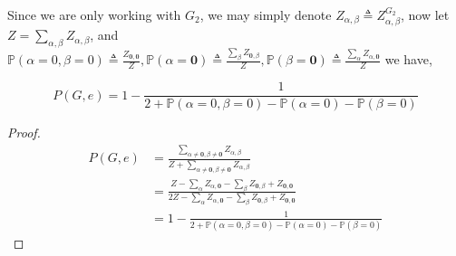 Since we are only working with $G_2$, we may simply denote $Z_{\alpha, \beta} \triangleq Z_{\alpha, \beta}^{G_2}$, now let $Z = \sum_{\alpha , \beta} Z_{\alpha, \beta}$, and $\mathbb{P} \left( \alpha = 0, \beta = 0 \right) \triangleq \frac{Z_{\mathbf{0},\mathbf{0}}}{Z}, \mathbb{P} \left( \alpha = \mathbf{0} \right) \triangleq \frac{\sum_{\beta} Z_{\mathbf{0}, \beta} }{Z}, \mathbb{P} \left( \beta = \mathbf{0} \right) \triangleq \frac{\sum_{\alpha} Z_{ \alpha , \mathbf{0}} }{Z}$ we have,

\begin{Prop}
	
\[P(G,e) =  1 - \frac{1}{2 + \mathbb{P}\left( \alpha = 0, \beta = 0 \right) - \mathbb{P} \left( \alpha = 0 \right) - \mathbb{P} \left( \beta = 0 \right)}\]
\end{Prop}
\begin{proof}
	\begin{align*}
P(G,e) &= \frac{\sum_{\alpha \neq \mathbf{0}, \beta \neq \mathbf{0}} Z_{\alpha, \beta}}{Z + \sum_{\alpha \neq \mathbf{0}, \beta \neq \mathbf{0}} Z_{\alpha, \beta}} \\
&=\frac{Z - \sum_{\alpha}Z_{\alpha,\mathbf{0}} - \sum_{\beta} Z_{\mathbf{0}, \beta} + Z_{\mathbf{0}, \mathbf{0}}}{2Z - \sum_{\alpha}Z_{\alpha,\mathbf{0}} - \sum_{\beta} Z_{\mathbf{0}, \beta} + Z_{\mathbf{0}, \mathbf{0}}} \\
&= 1 - \frac{1}{2 + \mathbb{P}\left( \alpha = 0, \beta = 0 \right) - \mathbb{P} \left( \alpha = 0 \right) - \mathbb{P} \left( \beta = 0 \right)}
	\end{align*}
\end{proof}


